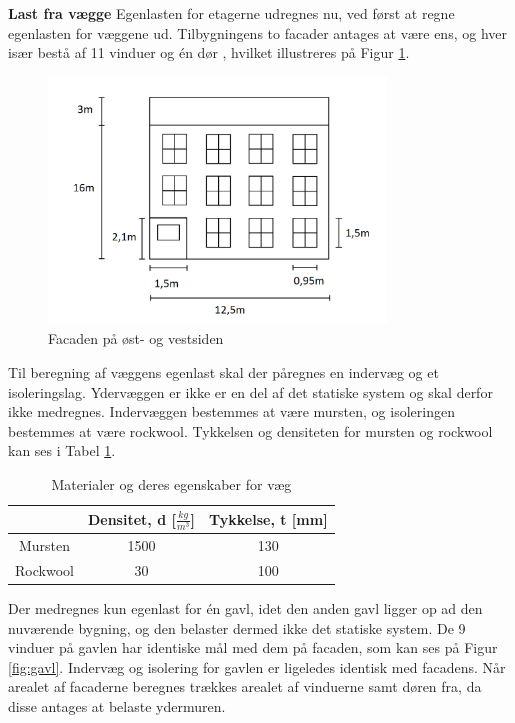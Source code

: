 \textbf{Last fra vægge}
\newline
Egenlasten for etagerne udregnes nu, ved først at regne egenlasten for væggene ud. Tilbygningens to facader antages at være ens, og hver især bestå af 11 vinduer og én dør \citep{gammellokalplan}, hvilket illustreres på Figur \ref{fig:facade}.

\begin{figure}[H]
	\centering
	\includegraphics[width=0.8\textwidth]{billeder/facadenord.png}
	\caption{Facaden på øst- og vestsiden}
	\label{fig:facade}
\end{figure}

Til beregning af væggens egenlast skal der påregnes en indervæg og et isoleringslag. Ydervæggen er ikke er en del af det statiske system og skal derfor ikke medregnes. Indervæggen bestemmes at være mursten, og isoleringen bestemmes at være rockwool. Tykkelsen og densiteten for mursten og rockwool kan ses i Tabel \ref{tab:murogwool}.

\begin{table}
	\begin{center}
		\begin{tabular}{|c|c|c|}
			\hline
			& Densitet, d [$\frac{kg}{m^3}$] & Tykkelse, t [mm] \\ \hline
			Mursten  & 1500  & 130     \\ \hline
			Rockwool & 30 & 100              \\ \hline
		\end{tabular}
		\caption{Materialer og deres egenskaber for væg \citep{murstendensitet} \citep{indervaeg} \citep{densitet} \citep{isolering}}
		\label{tab:murogwool}
	\end{center}
\end{table}

Der medregnes kun egenlast for én gavl, idet den anden gavl ligger op ad den nuværende bygning, og den belaster dermed ikke det statiske system. 
\newline \indent{     }  De 9 vinduer på gavlen har identiske mål med dem på facaden, som kan ses på Figur \ref{fig:gavl}. Indervæg og isolering for gavlen er ligeledes identisk med facadens.
\newline \indent{     }  Når arealet af facaderne beregnes trækkes arealet af vinduerne samt døren fra, da disse antages at belaste ydermuren.

